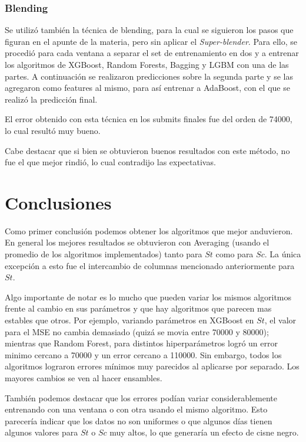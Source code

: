 \documentclass[a4paper, 12pt]{article}
\begin{document}
\subsubsection{Blending}
Se utilizó también la técnica de blending, para la cual se siguieron los pasos que figuran en el apunte de la materia, pero sin aplicar el \textit{Super-blender}. Para ello, se procedió para cada ventana a separar el set de entrenamiento en dos y a entrenar los algoritmos de XGBoost, Random Forests, Bagging y LGBM con una de las partes. A continuación se realizaron predicciones sobre la segunda parte y se las agregaron como features al mismo, para así entrenar a AdaBoost, con el que se realizó la predicción final.

El error obtenido con esta técnica en los submits finales fue del orden de 74000, lo cual resultó muy bueno.

Cabe destacar que si bien se obtuvieron buenos resultados con este método, no fue el que mejor rindió, lo cual contradijo las expectativas. 

\section{Conclusiones}
Como primer conclusión podemos obtener los algoritmos que mejor anduvieron. En general los mejores resultados se obtuvieron con Averaging (usando el promedio de los algoritmos implementados) tanto para $St$ como para $Sc$. La única excepción a esto fue el intercambio de columnas mencionado anteriormente para $St$.

Algo importante de notar es lo mucho que pueden variar los mismos algoritmos frente al cambio en sus parámetros y que hay algoritmos que parecen mas estables que otros. Por ejemplo, variando parámetros en XGBoost en $St$, el valor para el MSE no cambia demasiado (quizá se movia entre 70000 y 80000); mientras que Random Forest, para distintos hiperparámetros logró un error minimo cercano a 70000 y un error cercano a 110000.
Sin embargo, todos los algoritmos lograron errores mínimos muy parecidos al aplicarse por separado. Los mayores cambios se ven al hacer ensambles.

También podemos destacar que los errores podían variar considerablemente entrenando con una ventana o con otra usando el mismo algoritmo. Esto parecería indicar que los datos no son uniformes o que algunos días tienen algunos valores para $St$ o $Sc$ muy altos, lo que generaría un efecto de cisne negro.
\end{document}

